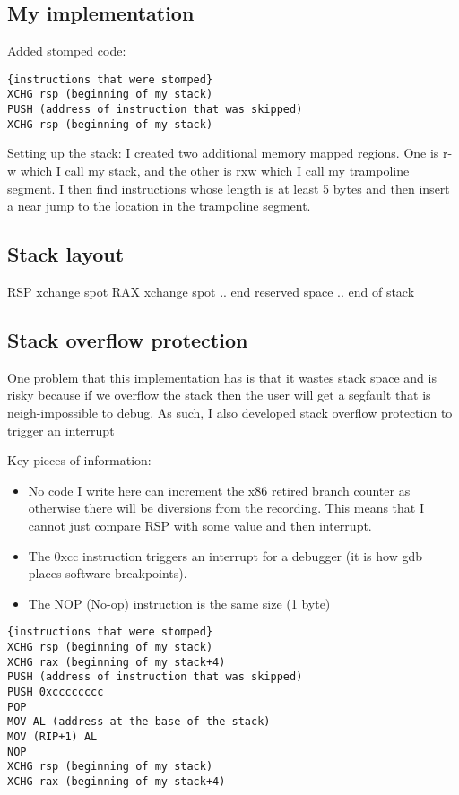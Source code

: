 \subsection{My implementation}


Added stomped code: 
\begin{verbatim}
{instructions that were stomped}
XCHG rsp (beginning of my stack)
PUSH (address of instruction that was skipped)
XCHG rsp (beginning of my stack)
\end{verbatim}

Setting up the stack:
I created two additional memory mapped regions. One is r-w which I call my stack, and the other is rxw which I call my trampoline segment. I then find instructions whose length is at least 5 bytes and then insert a near jump to the location in the trampoline segment. 

\subsection{Stack layout}
RSP xchange spot 
RAX xchange spot 
..
end reserved space 
..
end of stack


\subsection{Stack overflow protection}
One problem that this implementation has is that it wastes stack space and is risky because if we overflow the stack then the user will get a segfault that is neigh-impossible to debug. As such, I also developed stack overflow protection to trigger an interrupt 

Key pieces of information:
\begin{itemize}
    \item No code I write here can increment the x86 retired branch counter as otherwise there will be diversions from the recording. This means that I cannot just compare RSP with some value and then interrupt. 
    \item The 0xcc instruction triggers an interrupt for a debugger (it is how gdb places software breakpoints).
    \item The NOP (No-op) instruction is the same size (1 byte) 
\end{itemize}

\begin{verbatim}
{instructions that were stomped}
XCHG rsp (beginning of my stack)
XCHG rax (beginning of my stack+4)
PUSH (address of instruction that was skipped)
PUSH 0xcccccccc
POP 
MOV AL (address at the base of the stack) 
MOV (RIP+1) AL
NOP
XCHG rsp (beginning of my stack)
XCHG rax (beginning of my stack+4)
\end{verbatim}




%   
